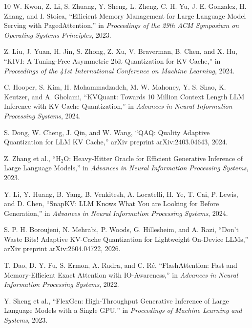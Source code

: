 \documentclass[11pt]{article}
\begin{document}
\begin{thebibliography}{10}
W. Kwon, Z. Li, S. Zhuang, Y. Sheng, L. Zheng, C. H. Yu, J. E. Gonzalez, H. Zhang, and I. Stoica, ``Efficient Memory Management for Large Language Model Serving with PagedAttention,'' in \emph{Proceedings of the 29th ACM Symposium on Operating Systems Principles}, 2023.

Z. Liu, J. Yuan, H. Jin, S. Zhong, Z. Xu, V. Braverman, B. Chen, and X. Hu, ``KIVI: A Tuning-Free Asymmetric 2bit Quantization for KV Cache,'' in \emph{Proceedings of the 41st International Conference on Machine Learning}, 2024.

C. Hooper, S. Kim, H. Mohammadzadeh, M. W. Mahoney, Y. S. Shao, K. Keutzer, and A. Gholami, ``KVQuant: Towards 10 Million Context Length LLM Inference with KV Cache Quantization,'' in \emph{Advances in Neural Information Processing Systems}, 2024.

S. Dong, W. Cheng, J. Qin, and W. Wang, ``QAQ: Quality Adaptive Quantization for LLM KV Cache,'' arXiv preprint arXiv:2403.04643, 2024.

Z. Zhang et al., ``H$_2$O: Heavy-Hitter Oracle for Efficient Generative Inference of Large Language Models,'' in \emph{Advances in Neural Information Processing Systems}, 2023.

Y. Li, Y. Huang, B. Yang, B. Venkitesh, A. Locatelli, H. Ye, T. Cai, P. Lewis, and D. Chen, ``SnapKV: LLM Knows What You are Looking for Before Generation,'' in \emph{Advances in Neural Information Processing Systems}, 2024.

S. P. H. Boroujeni, N. Mehrabi, P. Woods, G. Hillesheim, and A. Razi, ``Don't Waste Bits! Adaptive KV-Cache Quantization for Lightweight On-Device LLMs,'' arXiv preprint arXiv:2604.04722, 2026.

T. Dao, D. Y. Fu, S. Ermon, A. Rudra, and C. R\'e, ``FlashAttention: Fast and Memory-Efficient Exact Attention with IO-Awareness,'' in \emph{Advances in Neural Information Processing Systems}, 2022.

Y. Sheng et al., ``FlexGen: High-Throughput Generative Inference of Large Language Models with a Single GPU,'' in \emph{Proceedings of Machine Learning and Systems}, 2023.
\end{thebibliography}
\end{document}
